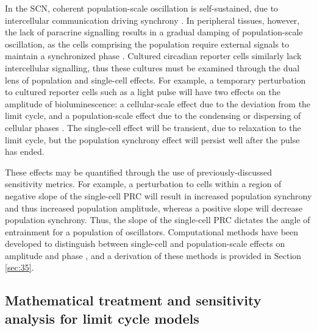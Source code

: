 In the SCN, coherent population-scale oscillation is self-sustained, due to intercellular communication driving synchrony \cite{Welsh2010}.
In peripheral tissues, however, the lack of paracrine signalling results in a gradual damping of population-scale oscillation, as the cells comprising the population require external signals to maintain a synchronized phase \cite{StJohn2015}.
Cultured circadian reporter cells similarly lack intercellular signalling, thus these cultures must be examined through the dual lens of population and single-cell effects.
For example, a temporary perturbation to cultured reporter cells such as a light pulse will have two effects on the amplitude of bioluminescence: a cellular-scale effect due to the deviation from the limit cycle, and a population-scale effect due to the condensing or dispersing of cellular phases \cite{Pulivarthy2007,Ukai2007,StJohn2014b}.
The single-cell effect will be transient, due to relaxation to the limit cycle, but the population synchrony effect will persist well after the pulse has ended.

These effects may be quantified through the use of previously-discussed sensitivity metrics.
For example, a perturbation to cells within a region of negative slope of the single-cell PRC will result in increased population synchrony and thus increased population amplitude, whereas a positive slope will decrease population synchrony.
Thus, the slope of the single-cell PRC dictates the angle of entrainment for a population of oscillators.
Computational methods have been developed to distinguish between single-cell and population-scale effects on amplitude and phase \cite{StJohn2014b}, and a derivation of these methods is provided in Section \ref{sec:35}.



\subsection*{Mathematical treatment and sensitivity analysis for limit cycle models\label{sec:34}}

